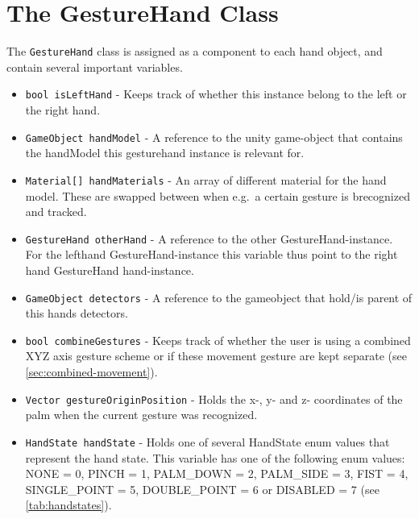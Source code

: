\section{The GestureHand Class}
The \texttt{GestureHand} class is assigned as a component to each hand object, and contain several important variables.
\begin{itemize}
	\item \texttt{bool isLeftHand} - Keeps track of whether this instance belong to the left or the right hand.
	\item \texttt{GameObject handModel} - A reference to the unity game-object that contains the handModel this gesturehand instance is relevant for.
	\item \texttt{Material[] handMaterials} - An array of different material for the hand model. These are swapped between when e.g.~a certain gesture is brecognized and tracked.
	\item \texttt{GestureHand otherHand} - A reference to the other GestureHand-instance. For the lefthand GestureHand-instance this variable thus point to the right hand GestureHand
			hand-instance.
	\item \texttt{GameObject detectors} - A reference to the gameobject that hold/is parent of this hands detectors.
	\item \texttt{bool combineGestures} - Keeps track of whether the user is using a combined XYZ axis gesture scheme or if these movement gesture are kept separate (see \ref{sec:combined-movement}).
	\item \texttt{Vector gestureOriginPosition} - Holds the x-, y- and z- coordinates of the palm when the current gesture was recognized.
	\item \texttt{HandState handState} - Holds one of several HandState enum values that represent the hand state. This variable has one of the following enum values:
			NONE = 0, PINCH = 1, PALM\_DOWN = 2, PALM\_SIDE = 3, FIST = 4, SINGLE\_POINT = 5, DOUBLE\_POINT = 6 or DISABLED = 7 (see \ref{tab:handstates}).  
\end{itemize}

